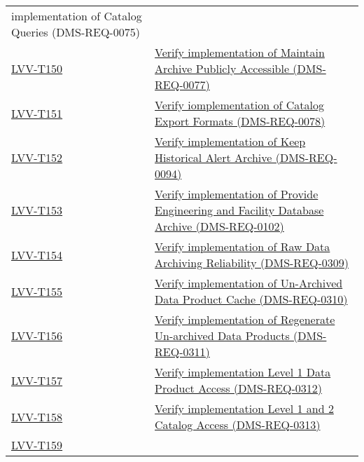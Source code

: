 \begin{longtable}[]{p{3cm}p{13cm}}
{implementation of Catalog Queries (DMS-REQ-0075)}\tabularnewline
\protect\hyperlink{lvv-t150---verify-implementation-of-maintain-archive-publicly-accessible-dms-req-0077}{LVV-T150}
&
\href{https://jira.lsstcorp.org/secure/Tests.jspa\#/testCase/LVV-T150}{Verify
implementation of Maintain Archive Publicly Accessible
(DMS-REQ-0077)}\tabularnewline
\protect\hyperlink{lvv-t151---verify-iomplementation-of-catalog-export-formats-dms-req-0078}{LVV-T151}
&
\href{https://jira.lsstcorp.org/secure/Tests.jspa\#/testCase/LVV-T151}{Verify
iomplementation of Catalog Export Formats (DMS-REQ-0078)}\tabularnewline
\protect\hyperlink{lvv-t152---verify-implementation-of-keep-historical-alert-archive-dms-req-0094}{LVV-T152}
&
\href{https://jira.lsstcorp.org/secure/Tests.jspa\#/testCase/LVV-T152}{Verify
implementation of Keep Historical Alert Archive
(DMS-REQ-0094)}\tabularnewline
\protect\hyperlink{lvv-t153---verify-implementation-of-provide-engineering-and-facility-database-archive-dms-req-0102}{LVV-T153}
&
\href{https://jira.lsstcorp.org/secure/Tests.jspa\#/testCase/LVV-T153}{Verify
implementation of Provide Engineering and Facility Database Archive
(DMS-REQ-0102)}\tabularnewline
\protect\hyperlink{lvv-t154---verify-implementation-of-raw-data-archiving-reliability-dms-req-0309}{LVV-T154}
&
\href{https://jira.lsstcorp.org/secure/Tests.jspa\#/testCase/LVV-T154}{Verify
implementation of Raw Data Archiving Reliability
(DMS-REQ-0309)}\tabularnewline
\protect\hyperlink{lvv-t155---verify-implementation-of-un-archived-data-product-cache-dms-req-0310}{LVV-T155}
&
\href{https://jira.lsstcorp.org/secure/Tests.jspa\#/testCase/LVV-T155}{Verify
implementation of Un-Archived Data Product Cache
(DMS-REQ-0310)}\tabularnewline
\protect\hyperlink{lvv-t156---verify-implementation-of-regenerate-un-archived-data-products-dms-req-0311}{LVV-T156}
&
\href{https://jira.lsstcorp.org/secure/Tests.jspa\#/testCase/LVV-T156}{Verify
implementation of Regenerate Un-archived Data Products
(DMS-REQ-0311)}\tabularnewline
\protect\hyperlink{lvv-t157---verify-implementation-level-1-data-product-access-dms-req-0312}{LVV-T157}
&
\href{https://jira.lsstcorp.org/secure/Tests.jspa\#/testCase/LVV-T157}{Verify
implementation Level 1 Data Product Access
(DMS-REQ-0312)}\tabularnewline
\protect\hyperlink{lvv-t158---verify-implementation-level-1-and-2-catalog-access-dms-req-0313}{LVV-T158}
&
\href{https://jira.lsstcorp.org/secure/Tests.jspa\#/testCase/LVV-T158}{Verify
implementation Level 1 and 2 Catalog Access
(DMS-REQ-0313)}\tabularnewline
\protect\hyperlink{lvv-t159---verify-implementation-of-regenerating-data-products-from-previous-data-releases-dms-req-0336}{LVV-T159}

\end{longtable}
